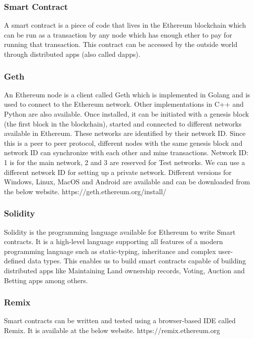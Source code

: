 \documentclass[11pt,openright]{report}
\begin{document}
\subsubsection{Smart Contract}
A smart contract is a piece of code that lives in the Ethereum blockchain which can be run as a transaction by any node which has enough ether to pay for running that transaction. This contract can be accessed by the outside world through distributed apps (also called dapps).

\subsubsection{Geth}
An Ethereum node is a client called Geth which is implemented in Golang and is used to connect to the Ethereum network. Other implementations in C++ and Python are also available. Once installed, it can be initiated with a genesis block (the first block in the blockchain), started and connected to different networks available in Ethereum. These networks are identified by their network ID. Since this is a peer to peer protocol, different nodes with the same genesis block and network ID can synchronize with each other and mine transactions. Network ID: 1 is for the main network, 2 and 3 are reserved for Test networks. We can use a different network ID for setting up a private network. Different versions for Windows, Linux, MacOS and Android are available and can be downloaded from the below website.
https://geth.ethereum.org/install/

\subsubsection{Solidity}
Solidity is the programming language available for Ethereum to write Smart contracts. It is a high-level language supporting all features of a modern programming language such as static-typing, inheritance and complex user-defined data types. This enables us to build smart contracts capable of building distributed apps like Maintaining Land ownership records, Voting, Auction and Betting apps among others.

\subsubsection{Remix}
Smart contracts can be written and tested using a browser-based IDE called Remix. It is available at the below website.
https://remix.ethereum.org
\end{document}

